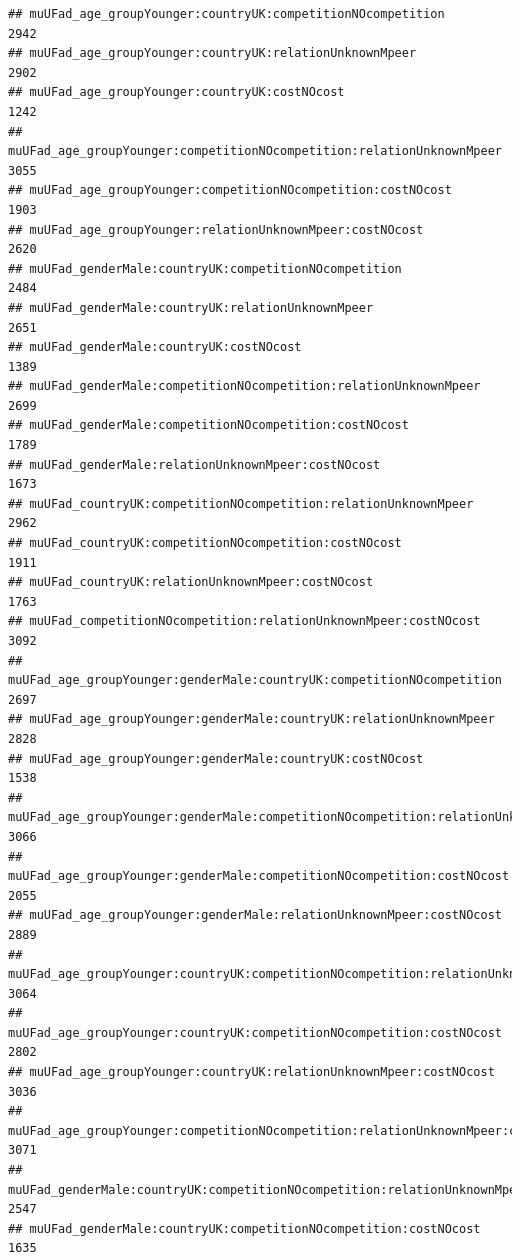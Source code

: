 \documentclass[
]{article}
\begin{document}
\begin{verbatim}
## muUFad_age_groupYounger:countryUK:competitionNOcompetition                            2942
## muUFad_age_groupYounger:countryUK:relationUnknownMpeer                                2902
## muUFad_age_groupYounger:countryUK:costNOcost                                          1242
## muUFad_age_groupYounger:competitionNOcompetition:relationUnknownMpeer                 3055
## muUFad_age_groupYounger:competitionNOcompetition:costNOcost                           1903
## muUFad_age_groupYounger:relationUnknownMpeer:costNOcost                               2620
## muUFad_genderMale:countryUK:competitionNOcompetition                                  2484
## muUFad_genderMale:countryUK:relationUnknownMpeer                                      2651
## muUFad_genderMale:countryUK:costNOcost                                                1389
## muUFad_genderMale:competitionNOcompetition:relationUnknownMpeer                       2699
## muUFad_genderMale:competitionNOcompetition:costNOcost                                 1789
## muUFad_genderMale:relationUnknownMpeer:costNOcost                                     1673
## muUFad_countryUK:competitionNOcompetition:relationUnknownMpeer                        2962
## muUFad_countryUK:competitionNOcompetition:costNOcost                                  1911
## muUFad_countryUK:relationUnknownMpeer:costNOcost                                      1763
## muUFad_competitionNOcompetition:relationUnknownMpeer:costNOcost                       3092
## muUFad_age_groupYounger:genderMale:countryUK:competitionNOcompetition                 2697
## muUFad_age_groupYounger:genderMale:countryUK:relationUnknownMpeer                     2828
## muUFad_age_groupYounger:genderMale:countryUK:costNOcost                               1538
## muUFad_age_groupYounger:genderMale:competitionNOcompetition:relationUnknownMpeer      3066
## muUFad_age_groupYounger:genderMale:competitionNOcompetition:costNOcost                2055
## muUFad_age_groupYounger:genderMale:relationUnknownMpeer:costNOcost                    2889
## muUFad_age_groupYounger:countryUK:competitionNOcompetition:relationUnknownMpeer       3064
## muUFad_age_groupYounger:countryUK:competitionNOcompetition:costNOcost                 2802
## muUFad_age_groupYounger:countryUK:relationUnknownMpeer:costNOcost                     3036
## muUFad_age_groupYounger:competitionNOcompetition:relationUnknownMpeer:costNOcost      3071
## muUFad_genderMale:countryUK:competitionNOcompetition:relationUnknownMpeer             2547
## muUFad_genderMale:countryUK:competitionNOcompetition:costNOcost                       1635

\end{verbatim}
\end{document}
